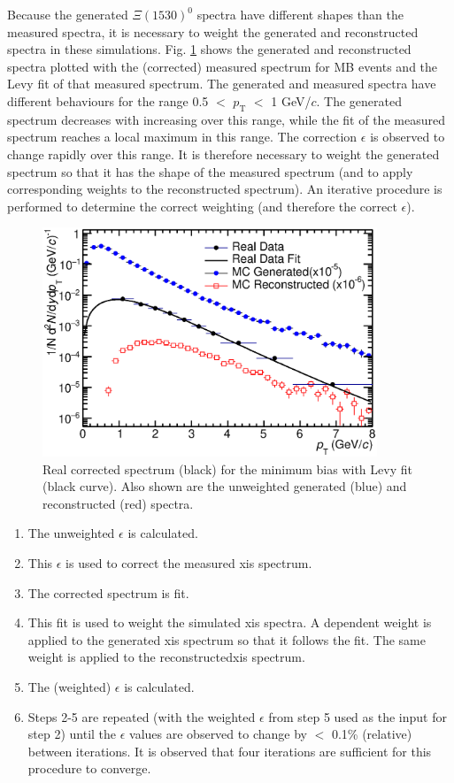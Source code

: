 Because the generated $\Xi(1530)^{0}$ spectra have different shapes than the measured \xis spectra, it is necessary to weight the generated and reconstructed \xis spectra in these simulations. Fig. \ref{fig:pPb:datagenrec} shows the generated and reconstructed \xis spectra plotted with the (corrected) measured \xis spectrum for MB events and the Levy fit of that measured spectrum. The generated and measured \xis spectra have  different behaviours for the range 0.5 $<$ $p_{\mathrm{T}}$ $<$ 1 GeV/$c$. The generated \xis spectrum decreases with increasing \pt over this range, while the fit of the measured \xis spectrum reaches a local maximum in this range. The correction $\epsilon$ is observed to change rapidly over this \pt range. It is therefore necessary to weight the generated spectrum so that it has the shape of the measured  \xis  spectrum (and to apply corresponding weights to the reconstructed \xis spectrum). An iterative procedure is performed to determine the correct weighting (and therefore the correct $\epsilon$). 
\begin{figure}[htbp]
\begin{center}
\includegraphics[width=10.0cm]{./Version1/FigChapter5/MC/Weighting.eps}
\caption{Real corrected \xis spectrum (black) for the minimum bias with Levy fit (black curve). Also shown are the unweighted generated (blue) and reconstructed (red) \xis spectra.}
\label{fig:pPb:datagenrec}
\end{center}
\end{figure}

\begin{enumerate}
\item The unweighted $\epsilon$ is calculated.
\item This $\epsilon$ is used to correct the measured xis spectrum.
\item The corrected \xis spectrum is fit.
\item This fit is used to weight the simulated xis spectra. A \pt dependent weight is applied to the generated xis spectrum so that it follows the fit. The same weight is applied to the reconstructedxis spectrum.
\item The (weighted) $\epsilon$ is calculated.
\item Steps 2-5 are repeated (with the weighted $\epsilon$ from step 5 used as the input for step 2) until the $\epsilon$ values are observed to change by $<$ 0.1\% (relative) between iterations. It is observed that four iterations are sufficient for this procedure to converge.
\end{enumerate}

